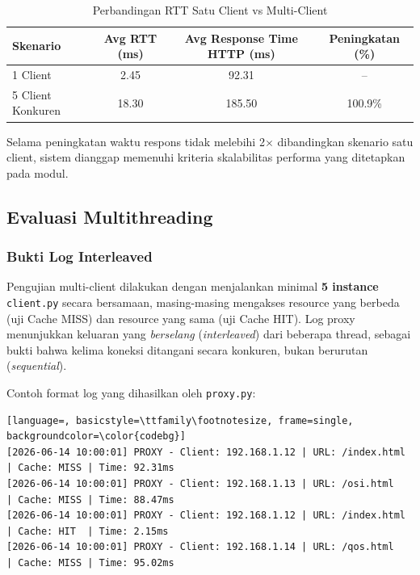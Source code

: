 \documentclass[11pt,a4paper]{article}
\begin{document}
\begin{table}[H]
\centering
\caption{Perbandingan RTT Satu Client vs Multi-Client}
\label{tab:single-multi}
\renewcommand{\arraystretch}{1.2}
\begin{tabular}{l c c c}
\toprule
\rowcolor{tableheader}
\textbf{Skenario} & \textbf{Avg RTT (ms)} & \textbf{Avg Response Time HTTP (ms)} & \textbf{Peningkatan (\%)} \\
\midrule
1 Client    & 2.45 & 92.31 & -- \\
5 Client Konkuren & 18.30 & 185.50 & 100.9\% \\
\bottomrule
\end{tabular}
\end{table}

\noindent Selama peningkatan waktu respons tidak melebihi 2$\times$ dibandingkan skenario satu client, sistem dianggap memenuhi kriteria skalabilitas performa yang ditetapkan pada modul.

\subsection{Evaluasi Multithreading}
\label{subsec:multi-client}

\subsubsection{Bukti Log Interleaved}

Pengujian multi-client dilakukan dengan menjalankan minimal \textbf{5 instance} \texttt{client.py} secara bersamaan, masing-masing mengakses resource yang berbeda (uji Cache MISS) dan resource yang sama (uji Cache HIT). Log proxy menunjukkan keluaran yang \textit{berselang} (\textit{interleaved}) dari beberapa thread, sebagai bukti bahwa kelima koneksi ditangani secara konkuren, bukan berurutan (\textit{sequential}).

Contoh format log yang dihasilkan oleh \texttt{proxy.py}:
\begin{lstlisting}[language=, basicstyle=\ttfamily\footnotesize, frame=single, backgroundcolor=\color{codebg}]
[2026-06-14 10:00:01] PROXY - Client: 192.168.1.12 | URL: /index.html | Cache: MISS | Time: 92.31ms
[2026-06-14 10:00:01] PROXY - Client: 192.168.1.13 | URL: /osi.html   | Cache: MISS | Time: 88.47ms
[2026-06-14 10:00:01] PROXY - Client: 192.168.1.12 | URL: /index.html | Cache: HIT  | Time: 2.15ms
[2026-06-14 10:00:01] PROXY - Client: 192.168.1.14 | URL: /qos.html   | Cache: MISS | Time: 95.02ms
\end{lstlisting}
\end{document}
